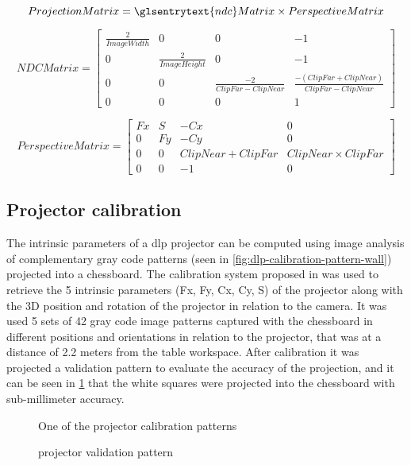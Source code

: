 {
	\small
	\begin{equation}\label{eq:projection-matrix}
	ProjectionMatrix = \glsentrytext{ndc}Matrix \times PerspectiveMatrix
	\end{equation}
	
	\begin{equation}\label{eq:ndc-matrix}
	NDCMatrix = 
	\begin{bmatrix}
	\frac{2}{ImageWidth} & 0 & 0 & -1 \\
	0 & \frac{2}{ImageHeight} & 0 & -1 \\
	0 & 0 & \frac{-2}{ClipFar - ClipNear} & \frac{-(ClipFar + ClipNear)}{ClipFar - ClipNear} \\
	0 & 0 & 0 & 1
	\end{bmatrix}
	\end{equation}
	
	
	\begin{equation}\label{eq:perspective-matrix}
	PerspectiveMatrix = 
	\begin{bmatrix}
	Fx & S & -Cx & 0 \\
	0 & Fy & -Cy & 0 \\
	0 & 0 & ClipNear + ClipFar & ClipNear \times ClipFar \\
	0 & 0 & -1 & 0
	\end{bmatrix}
	\end{equation}
}


\subsection{Projector calibration}

The intrinsic parameters of a \gls{dlp} projector can be computed using image analysis of complementary gray code patterns (seen in \cref{fig:dlp-calibration-pattern-wall}) projected into a chessboard. The calibration system proposed in \cite{Moreno2012} was used to retrieve the 5 intrinsic parameters (Fx, Fy, Cx, Cy, S) of the projector along with the 3D position and rotation of the projector in relation to the camera. It was used 5 sets of 42 gray code image patterns captured with the chessboard in different positions and orientations in relation to the projector, that was at a distance of 2.2 meters from the table workspace. After calibration it was projected a validation pattern to evaluate the accuracy of the projection, and it can be seen in \cref{fig:dlp-projected-chessboard} that the white squares were projected into the chessboard with sub-millimeter accuracy.

\begin{figure}[H]
	\begin{floatrow}[2]
		{\caption{One of the  projector calibration patterns}\label{fig:dlp-calibration-pattern-wall}}
		{\caption{ projector validation pattern}\label{fig:dlp-projected-chessboard}}
	\end{floatrow}
\end{figure}


